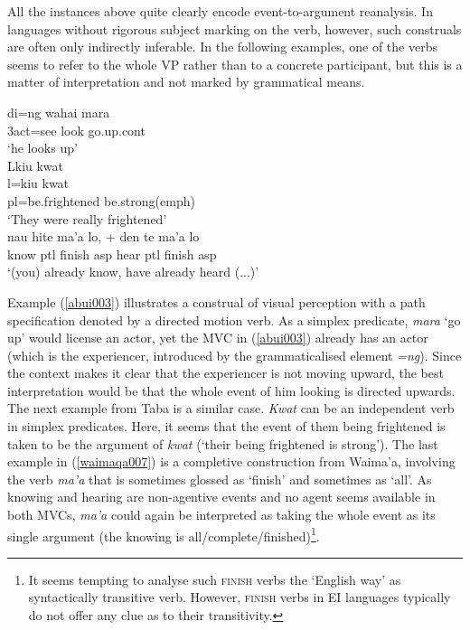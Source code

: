 All the instances above quite clearly encode event-to-argument reanalysis. In languages without rigorous subject marking on the verb, however, such construals are often only indirectly inferable. In the following examples, one of the verbs seems to refer to the whole VP rather than to a concrete participant, but this is a matter of interpretation and not marked by grammatical means.

\ea \label{abui003}
\gll di=ng wahai mara \\
3\acs{act}=see look go.up.\acs{cont} \\
\glft `he looks up’ \\ 
\z
\xe
\ea \label{}
\gll Lkiu kwat \\
l=kiu kwat \\
\acs{pl}=be.frightened be.strong(\acs{emph}) \\
\glft `They were really frightened' \\ 
\z
\xe
\ea \label{waimaqa007}
\gll nau hite ma'a lo, + den te ma'a lo \\
know \acs{ptl} finish \acs{asp} hear \acs{ptl} finish \acs{asp} \\
\glft `(you) already know, have already heard (...)' \\ 
\z
\xe

Example (\ref{abui003}) illustrates a construal of visual perception with a path specification denoted by a directed motion verb. As a simplex predicate, \textit{mara} `go up' would license an actor, yet the MVC in (\ref{abui003}) already has an actor (which is the experiencer, introduced by the grammaticalised element \textit{=ng}). Since the context makes it clear that the experiencer is not moving upward, the best interpretation would be that the whole event of him looking is directed upwards. The next example from Taba is a similar case. \textit{Kwat} can be an independent verb in simplex predicates. Here, it seems that the event of them being frightened is taken to be the argument of \textit{kwat} (`their being frightened is strong'). The last example in (\ref{waimaqa007}) is a completive construction from Waima'a, involving the verb \textit{ma'a} that is sometimes glossed as `finish' and sometimes as `all'. As knowing and hearing are non-agentive events and no agent seems available in both MVCs, \textit{ma'a} could again be interpreted as taking the whole event as its single argument (the knowing is all/complete/finished)\footnote{It seems tempting to analyse such \textsc{finish} verbs the `English way' as syntactically transitive verb. However, \textsc{finish} verbs in EI languages typically do not offer any clue as to their transitivity.}.

